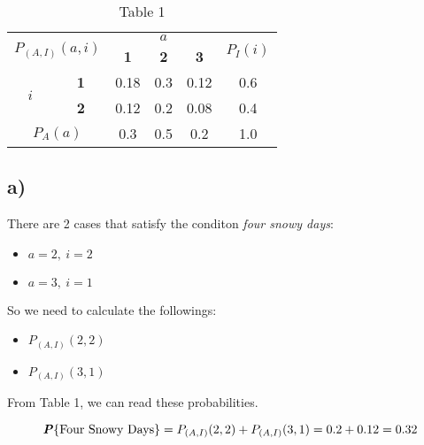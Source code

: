 \documentclass[12pt]{article}
\newcommand{\prob}[1]{\textbf{\textit{P}}\{#1\}}
\newcommand{\probb}[2]{P_{(#1)}(#2)}
\begin{document}
\renewcommand{\arraystretch}{1.5}
\begin{table}[h!]
\centering
\begin{tabular}{|c|c|c|c|c|c|} 
    \hline
    \multicolumn{2}{|c|}{\multirow{2}{*}{$P_{(A,I)}(a, i)$}} & \multicolumn{3}{c|}{$a$}             & \multirow{2}{*}{$P_{I}(i)$}  \\ 
    \cline{3-5}
    \multicolumn{2}{|c|}{}                           & \textbf{1} & \textbf{2} & \textbf{3} &                          \\ 
    \hline
    \multirow{2}{*}{$i$} & \textbf{1}                & 0.18       & 0.3        & 0.12       & 0.6                      \\
                         & \textbf{2}                & 0.12       & 0.2        & 0.08       & 0.4                      \\ 
    \hline
    \multicolumn{2}{|c|}{$P_A(a)$}                     & 0.3        & 0.5        & 0.2        & 1.0                      \\
    \hline
\end{tabular}
\caption*{Table 1}
\end{table}

\subsection*{a)}

\noindent There are 2 cases that satisfy the conditon \textit{four snowy days}:
\begin{multicols}{4}
    \begin{itemize}
        \item $a = 2,\ i = 2$
        \item $a = 3,\ i = 1$
    \end{itemize}
\end{multicols}

\noindent So we need to calculate the followings:
\begin{multicols}{4}
    \begin{itemize}
        \item $\probb{A,I}{2, 2}$
        \item $\probb{A,I}{3, 1}$
    \end{itemize}
\end{multicols}

\noindent From Table 1, we can read these probabilities.

\begin{equation*}
    \prob{\text{Four Snowy Days}} = \probb{A, I}{2, 2} + \probb{A, I}{3, 1} = 0.2 + 0.12 = 0.32
\end{equation*}
\end{document}
